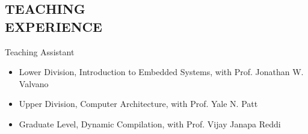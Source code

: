 \documentclass[margin, 9pt]{res} %
\begin{document}
\begin{resume}

\section{TEACHING\\ EXPERIENCE} 

{\large{Teaching Assistant}}\\
\vspace*{-5pt}
\begin{itemize}[leftmargin=*] \itemsep -2pt
\vspace*{-5pt}
	\item Lower Division, Introduction to Embedded Systems, with Prof. Jonathan W. Valvano
	\item Upper Division, Computer Architecture, with Prof. Yale N. Patt
	\item Graduate Level, Dynamic Compilation, with Prof. Vijay Janapa Reddi
\end{itemize}


%


\end{resume}
\end{document}
